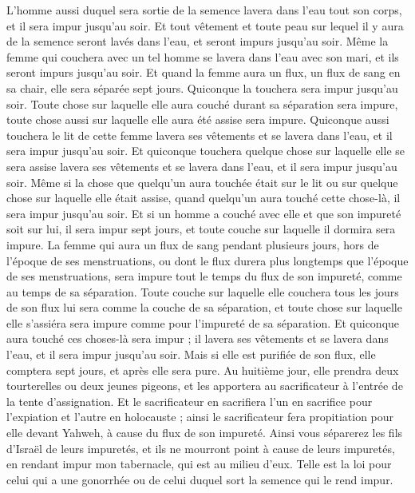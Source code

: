 \begin{multicols}{2}
L'homme aussi duquel sera sortie de la semence lavera dans l'eau tout son corps, et il sera impur jusqu'au soir.
Et tout vêtement et toute peau sur lequel il y aura de la semence seront lavés dans l'eau, et seront impurs jusqu'au soir.
Même la femme qui couchera avec un tel homme se lavera dans l'eau avec son mari, et ils seront impurs jusqu'au soir.
Et quand la femme aura un flux, un flux de sang en sa chair, elle sera séparée sept jours. Quiconque la touchera sera impur jusqu'au soir.
Toute chose sur laquelle elle aura couché durant sa séparation sera impure, toute chose aussi sur laquelle elle aura été assise sera impure.
Quiconque aussi touchera le lit de cette femme lavera ses vêtements et se lavera dans l'eau, et il sera impur jusqu'au soir.
Et quiconque touchera quelque chose sur laquelle elle se sera assise lavera ses vêtements et se lavera dans l'eau, et il sera impur jusqu'au soir.
Même si la chose que quelqu'un aura touchée était sur le lit ou sur quelque chose sur laquelle elle était assise, quand quelqu'un aura touché cette chose-là, il sera impur jusqu'au soir.
Et si un homme a couché avec elle et que son impureté soit sur lui, il sera impur sept jours, et toute couche sur laquelle il dormira sera impure.
La femme qui aura un flux de sang pendant plusieurs jours, hors de l'époque de ses menstruations, ou dont le flux durera plus longtemps que l'époque de ses menstruations, sera impure tout le temps du flux de son impureté, comme au temps de sa séparation.
Toute couche sur laquelle elle couchera tous les jours de son flux lui sera comme la couche de sa séparation, et toute chose sur laquelle elle s'assiéra sera impure comme pour l'impureté de sa séparation.
Et quiconque aura touché ces choses-là sera impur ; il lavera ses vêtements et se lavera dans l'eau, et il sera impur jusqu'au soir.
Mais si elle est purifiée de son flux, elle comptera sept jours, et après elle sera pure.
Au huitième jour, elle prendra deux tourterelles ou deux jeunes pigeons, et les apportera au sacrificateur à l'entrée de la tente d'assignation.
Et le sacrificateur en sacrifiera l'un en sacrifice pour l'expiation et l'autre en holocauste ; ainsi le sacrificateur fera propitiation pour elle devant Yahweh, à cause du flux de son impureté.
Ainsi vous séparerez les fils d'Israël de leurs impuretés, et ils ne mourront point à cause de leurs impuretés, en rendant impur mon tabernacle, qui est au milieu d'eux.
Telle est la loi pour celui qui a une gonorrhée ou de celui duquel sort la semence qui le rend impur.

\end{multicols}
